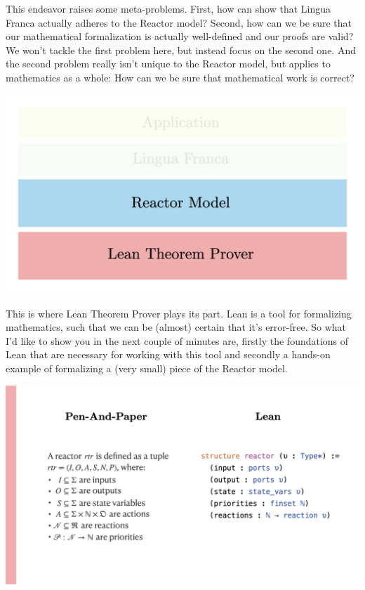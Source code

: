 \documentclass{article}
\begin{document}
This endeavor raises some meta-problems. First, how can show that Lingua
Franca actually adheres to the Reactor model? Second, how can we be sure
that our mathematical formalization is actually well-defined and our
proofs are valid? We won't tackle the first problem here, but instead
focus on the second one. And the second problem really isn't unique to
the Reactor model, but applies to mathematics as a whole: How can we be
sure that mathematical work is correct?

\begin{center}
  \includegraphics[width=\columnwidth]{Slides/Slide 2.jpeg}
\end{center}

This is where Lean Theorem Prover plays its part. Lean is a tool for
formalizing mathematics, such that we can be (almost) certain that it's
error-free. So what I'd like to show you in the next couple of minutes
are, firstly the foundations of Lean that are necessary for working with
this tool and secondly a hands-on example of formalizing a (very small)
piece of the Reactor model.

\begin{center}
  \includegraphics[width=\columnwidth]{Slides/Slide 3.jpeg}
\end{center}
\end{document}
